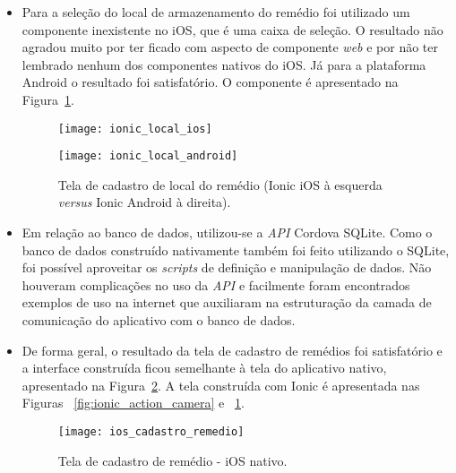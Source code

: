 \begin{itemize}
\begin{itemize}
			 	\item Para a seleção do local de armazenamento do remédio foi utilizado um componente inexistente no iOS, que é uma caixa de seleção. O resultado não agradou muito por ter ficado com aspecto de componente \textit{web} e por não ter lembrado nenhum dos componentes nativos do iOS. Já para a plataforma Android o resultado foi satisfatório. O componente é apresentado na Figura~\ref{fig:ionic_local}.
			 	
			 		 \begin{figure}[H]
			 		 	\centering
			 		 	\begin{minipage}{.5\textwidth}
			 		 		\centering
			 		 		\texttt{[image: ionic\_local\_ios]}
			 		 	\end{minipage}\hfill
			 		 	\begin{minipage}{.5\textwidth}
			 		 		\centering
			 		 		\texttt{[image: ionic\_local\_android]}
			 		 	\end{minipage}
			 		 	\caption[Tela de cadastro de local do remédio  (Ionic iOS \textit{versus} Ionic Android)]{ Tela de cadastro de local do remédio  (Ionic iOS à esquerda \textit{versus} Ionic Android à direita).}
			 		 	\label{fig:ionic_local}
			 		 \end{figure}
			 	
		 		\item Em relação ao banco de dados, utilizou-se a \textit{API} Cordova SQLite. Como o banco de dados 
		 		construído nativamente também foi feito utilizando o SQLite, foi possível aproveitar os \textit{scripts} 
		 		de definição e manipulação de dados. Não houveram complicações no uso da \textit{API} e facilmente 
		 		foram encontrados exemplos de uso na internet que auxiliaram na estruturação da camada de comunicação 
		 		do aplicativo com o banco de dados.
		 		
		 		\item De forma geral, o resultado da tela de cadastro de remédios foi satisfatório e a interface construída ficou semelhante à tela do aplicativo nativo, apresentado na Figura~\ref{fig:ios_cadastro_remedio}. A tela construída com Ionic é apresentada nas Figuras ~\ref{fig:ionic_action_camera} e ~\ref{fig:ionic_local}.
		 		
		 			 	\begin{figure}[H]
		 			 		\centering
		 			 		\texttt{[image: ios\_cadastro\_remedio]}
		 			 		\caption[Tela de cadastro de remédio - iOS]{Tela de cadastro de remédio - iOS nativo.}
		 			 		\label{fig:ios_cadastro_remedio}
		 			 	\end{figure}
			 

\end{itemize}
\end{itemize}
